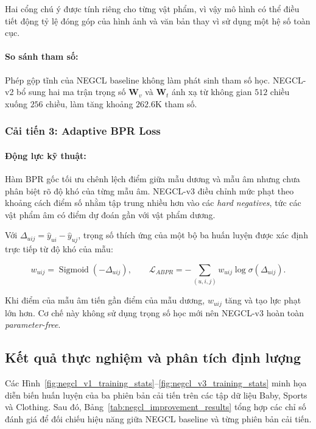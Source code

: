 Hai cổng chú ý được tính riêng cho từng vật phẩm, vì vậy mô hình có thể điều tiết động tỷ lệ đóng góp của hình ảnh và văn bản thay vì sử dụng một hệ số toàn cục.

\paragraph{So sánh tham số:}
Phép gộp tĩnh của NEGCL baseline không làm phát sinh tham số học. NEGCL-v2 bổ sung hai ma trận trọng số $\mathbf{W}_v$ và $\mathbf{W}_t$ ánh xạ từ không gian $512$ chiều xuống $256$ chiều, làm tăng khoảng $262.6$K tham số.

\subsubsection{Cải tiến 3: Adaptive BPR Loss}

\paragraph{Động lực kỹ thuật:}
Hàm BPR gốc tối ưu chênh lệch điểm giữa mẫu dương và mẫu âm nhưng chưa phân biệt rõ độ khó của từng mẫu âm. NEGCL-v3 điều chỉnh mức phạt theo khoảng cách điểm số nhằm tập trung nhiều hơn vào các \textit{hard negatives}, tức các vật phẩm âm có điểm dự đoán gần với vật phẩm dương.

Với $\Delta_{uij}=\hat{y}_{ui}-\hat{y}_{uj}$, trọng số thích ứng của một bộ ba huấn luyện được xác định trực tiếp từ độ khó của mẫu:

\begin{equation}
w_{uij}=\operatorname{Sigmoid}(-\Delta_{uij}),
\qquad
\mathcal{L}_{ABPR}
=-\sum_{(u,i,j)}w_{uij}\log\sigma(\Delta_{uij}).
\end{equation}

Khi điểm của mẫu âm tiến gần điểm của mẫu dương, $w_{uij}$ tăng và tạo lực phạt lớn hơn. Cơ chế này không sử dụng trọng số học mới nên NEGCL-v3 hoàn toàn \textit{parameter-free}.

\subsection{Kết quả thực nghiệm và phân tích định lượng}

Các Hình~\ref{fig:negcl_v1_training_stats}--\ref{fig:negcl_v3_training_stats} minh họa diễn biến huấn luyện của ba phiên bản cải tiến trên các tập dữ liệu Baby, Sports và Clothing. Sau đó, Bảng~\ref{tab:negcl_improvement_results} tổng hợp các chỉ số đánh giá để đối chiếu hiệu năng giữa NEGCL baseline và từng phiên bản cải tiến.

